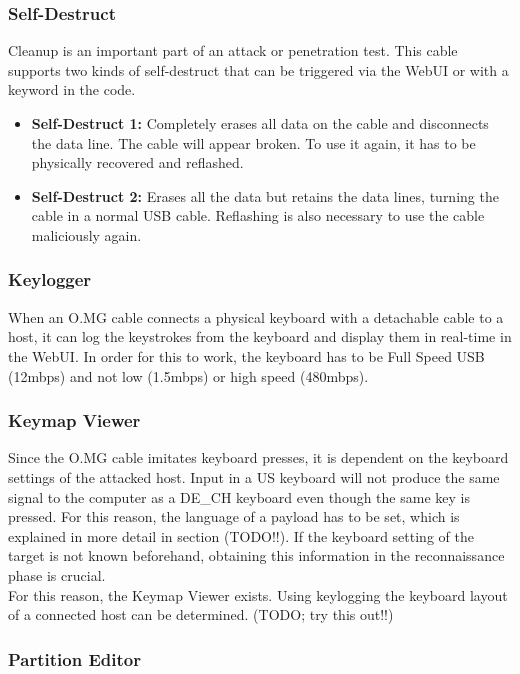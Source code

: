 \subsubsection{Self-Destruct}

Cleanup is an important part of an attack or penetration test. This cable supports two kinds of self-destruct that can be triggered via the WebUI or with a keyword in the code.
\begin{itemize}
    \item  \textbf{Self-Destruct 1:} Completely erases all data on the cable and disconnects the data line. The cable will appear broken. To use it again, it has to be physically recovered and reflashed.  
    \item  \textbf{Self-Destruct 2:}  Erases all the data but retains the data lines, turning the cable in a normal USB cable. Reflashing is also necessary to use the cable maliciously again. 
\end{itemize}


\subsubsection{Keylogger}

When an O.MG cable connects a physical keyboard with a detachable cable to a host, it can log the keystrokes from the keyboard and display them in real-time in the WebUI. In order for this to work, the keyboard has to be Full Speed USB (12mbps) and not low (1.5mbps) or high speed (480mbps). 

\subsubsection{Keymap Viewer}

Since the O.MG cable imitates keyboard presses, it is dependent on the keyboard settings of the attacked host. Input in a US keyboard will not produce the same signal to the computer as a DE\_CH keyboard even though the same key is pressed. For this reason, the language of a payload has to be set, which is explained in more detail in section (TODO!!). If the keyboard setting of the target is not known beforehand, obtaining this information in the reconnaissance phase is crucial. \\
For this reason, the Keymap Viewer exists. Using keylogging the keyboard layout of a connected host can be determined. (TODO; try this out!!)

\subsubsection{Partition Editor}


